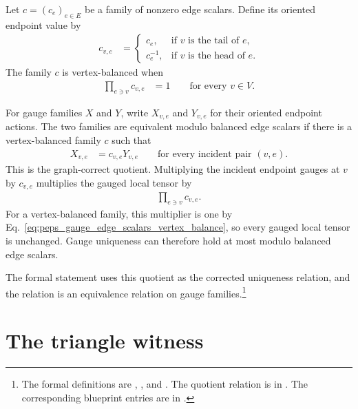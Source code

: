\documentclass{article}
\begin{document}
Let $c=(c_e)_{e\in E}$ be a family of nonzero edge scalars. Define its oriented
endpoint value by
\begin{align}
    c_{v,e}
        &=
        \begin{cases}
            c_e, & \text{if $v$ is the tail of $e$},\\
            c_e^{-1}, & \text{if $v$ is the head of $e$}.
        \end{cases}
    \label{eq:peps_gauge_edge_scalars_oriented_endpoint_scalar}
\end{align}
The family $c$ is vertex-balanced when
\begin{align}
    \prod_{e\ni v}c_{v,e}
        &= 1
        \qquad\text{for every }v\in V.
    \label{eq:peps_gauge_edge_scalars_vertex_balance}
\end{align}

For gauge families $X$ and $Y$, write $X_{v,e}$ and $Y_{v,e}$ for their
oriented endpoint actions. The two families are equivalent modulo balanced
edge scalars if there is a vertex-balanced family $c$ such that
\begin{align}
    X_{v,e}
        &= c_{v,e}Y_{v,e}
        \qquad\text{for every incident pair }(v,e).
    \label{eq:peps_gauge_edge_scalars_quotient_relation}
\end{align}
This is the graph-correct quotient. Multiplying the incident endpoint gauges at
$v$ by $c_{v,e}$ multiplies the gauged local tensor by
\begin{align}
    \prod_{e\ni v}c_{v,e}.
    \label{eq:peps_gauge_edge_scalars_local_tensor_multiplier}
\end{align}
For a vertex-balanced family, this multiplier is one by
Eq.~\ref{eq:peps_gauge_edge_scalars_vertex_balance}, so every gauged local
tensor is unchanged. Gauge uniqueness can therefore hold at most modulo
balanced edge scalars.

The formal statement uses this quotient as the corrected uniqueness relation,
and the relation is an equivalence relation on gauge families.\footnote{The
formal definitions are ,
, and
. The quotient relation is
 in
. The corresponding blueprint entries
are in .}

\section{The triangle witness}
\end{document}
